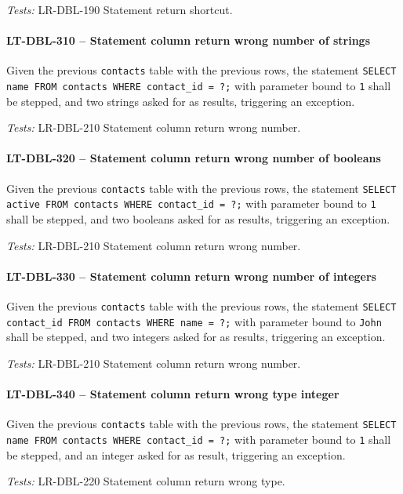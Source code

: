 \textit{Tests: } LR-DBL-190 Statement return shortcut.

\paragraph{LT-DBL-310 -- Statement column return wrong number of strings}
Given the previous \lstinline{contacts} table with the previous rows,
the statement
\lstinline{SELECT name FROM contacts WHERE contact_id = ?;}
with parameter bound to \lstinline{1} shall be stepped,
and two strings asked for as results, triggering an exception.

\textit{Tests: } LR-DBL-210 Statement column return wrong number.

\paragraph{LT-DBL-320 -- Statement column return wrong number of booleans}
Given the previous \lstinline{contacts} table with the previous rows,
the statement
\lstinline{SELECT active FROM contacts WHERE contact_id = ?;}
with parameter bound to \lstinline{1} shall be stepped,
and two booleans asked for as results, triggering an exception.

\textit{Tests: } LR-DBL-210 Statement column return wrong number.

\paragraph{LT-DBL-330 -- Statement column return wrong number of integers}
Given the previous \lstinline{contacts} table with the previous rows,
the statement
\lstinline{SELECT contact_id FROM contacts WHERE name = ?;}
with parameter bound to \lstinline{John} shall be stepped,
and two integers asked for as results, triggering an exception.

\textit{Tests: } LR-DBL-210 Statement column return wrong number.

\paragraph{LT-DBL-340 -- Statement column return wrong type integer}
Given the previous \lstinline{contacts} table with the previous rows,
the statement
\lstinline{SELECT name FROM contacts WHERE contact_id = ?;}
with parameter bound to \lstinline{1} shall be stepped,
and an integer asked for as result, triggering an exception.

\textit{Tests: } LR-DBL-220 Statement column return wrong type.

